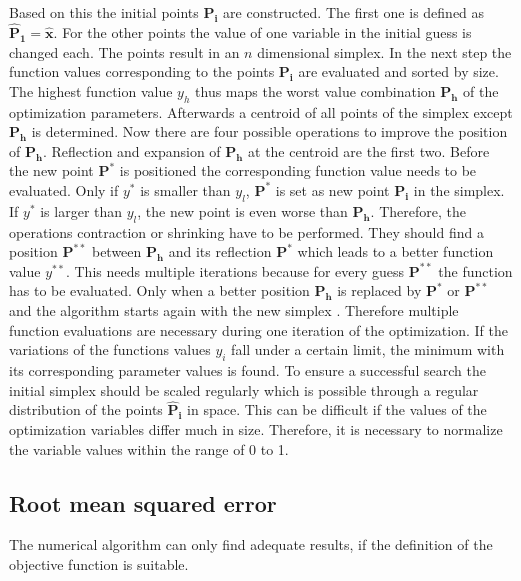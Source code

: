Based on this the initial points $\mathbf{\hat{P}_i}$ are constructed. The first one is defined as $\mathbf{\hat{P}_1} = \mathbf{\hat{x}}$. For the other points the value of one variable in the initial guess is changed each. The points result in an $n$ dimensional simplex. In the next step the function values corresponding to the points $\mathbf{P_i}$ are evaluated and sorted by size. The highest function value $y_h$ thus maps the worst value combination $\mathbf{P_h}$ of the optimization parameters. Afterwards a centroid of all points of the simplex except $\mathbf{P_h}$ is determined. Now there are four possible operations to improve the position of $\mathbf{P_h}$. Reflection and expansion of $\mathbf{P_h}$ at the centroid are the first two. Before the new point $\mathbf{P^{*}}$ is positioned the corresponding function value needs to be evaluated. Only if $y^{*}$ is smaller than $y_l$, $\mathbf{P^{*}}$ is set as new point $\mathbf{P_i}$ in the simplex. If $y^{*}$ is larger than $y_l$, the new point is even worse than $\mathbf{P_h}$. Therefore, the operations contraction or shrinking have to be performed. They should find a position $\mathbf{P^{**}}$ between $\mathbf{P_h}$ and its reflection $\mathbf{P^{*}}$ which leads to a better function value $y^{**}$. This needs multiple iterations because for every guess $\mathbf{P^{**}}$ the function has to be evaluated. Only when a better position $\mathbf{P_h}$ is replaced by $\mathbf{P^{*}}$ or $\mathbf{P^{**}}$ and the algorithm starts again with the new simplex \cite{nelder_simplex_1965}. Therefore multiple function evaluations are necessary during one iteration of the optimization. If the variations of the functions values $y_i$ fall under a certain limit, the minimum with its corresponding parameter values is found. To ensure a successful search the initial simplex should be scaled regularly \cite{baudin_nelder-mead_nodate} which is possible through a regular distribution of the points $\mathbf{\hat{P}_i}$ in space. This can be difficult if the values of the optimization variables differ much in size. Therefore, it is necessary to normalize the variable values within the range of 0 to 1.

\subsection{Root mean squared error} \label{subsec: RMSE}
The numerical algorithm can only find adequate results, if the definition of the objective function is suitable. 






